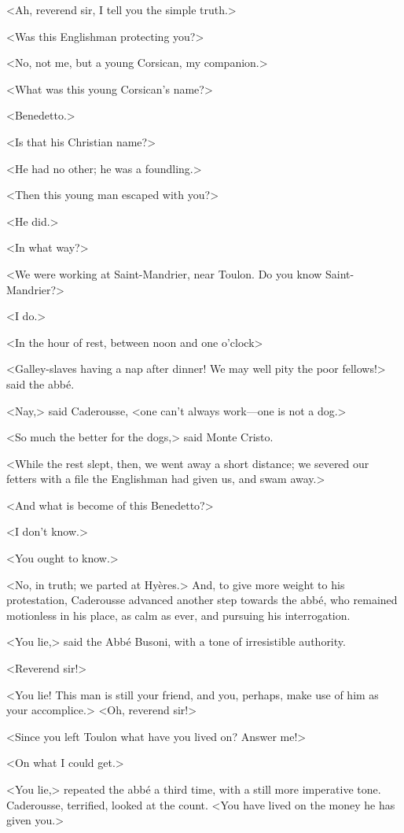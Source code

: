  <Ah, reverend sir, I tell you the simple truth.> 

 <Was this Englishman protecting you?> 

 <No, not me, but a young Corsican, my companion.> 

 <What was this young Corsican's name?> 

 <Benedetto.> 

 <Is that his Christian name?> 

 <He had no other; he was a foundling.> 

 <Then this young man escaped with you?> 

 <He did.> 

 <In what way?> 

 <We were working at Saint-Mandrier, near Toulon. Do you know Saint-Mandrier?> 

 <I do.> 

 <In the hour of rest, between noon and one o'clock\longdash> 

 <Galley-slaves having a nap after dinner! We may well pity the poor fellows!> said the abbé. 

 <Nay,> said Caderousse, <one can't always work—one is not a dog.> 

 <So much the better for the dogs,> said Monte Cristo. 

 <While the rest slept, then, we went away a short distance; we severed our fetters with a file the Englishman had given us, and swam away.> 

 <And what is become of this Benedetto?> 

 <I don't know.> 

 <You ought to know.> 

 <No, in truth; we parted at Hyères.> And, to give more weight to his protestation, Caderousse advanced another step towards the abbé, who remained motionless in his place, as calm as ever, and pursuing his interrogation. 

 <You lie,> said the Abbé Busoni, with a tone of irresistible authority. 

 <Reverend sir!> 

 <You lie! This man is still your friend, and you, perhaps, make use of him as your accomplice.>  <Oh, reverend sir!> 

 <Since you left Toulon what have you lived on? Answer me!> 

 <On what I could get.> 

 <You lie,> repeated the abbé a third time, with a still more imperative tone. Caderousse, terrified, looked at the count. <You have lived on the money he has given you.> 

